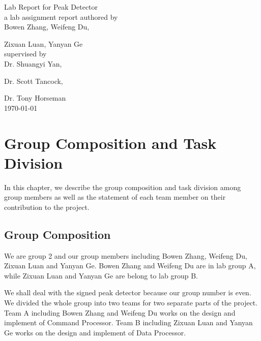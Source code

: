\documentclass[11pt,a4paper]{report}
\begin{document}
\begin{titlepage}
\centering
\vspace{8cm}
\huge Lab Report for Peak Detector \\
\vspace{2cm}
\large a lab assignment report authored by\\
\Large Bowen Zhang, Weifeng Du, \par Zixuan Luan, Yanyan Ge\\
\vspace{4cm}
\large supervised by\\
\large Dr. Shuangyi Yan,\par Dr. Scott Tancock,\par Dr. Tony Horseman\\
\vspace{2cm}
\daymonthyear\today \\
\end{titlepage}

%
\tableofcontents
\glsaddall

\chapter{Group Composition and Task Division}
\label{chap:Group Composition and Task Division}

In this chapter, we describe the group composition and task division
among group members as well as the statement of each team member on their contribution to the project.

\section{Group Composition} 
\label{sec:Group Composition}
We are group 2 and our group members including Bowen Zhang, Weifeng Du, Zixuan Luan and Yanyan Ge. Bowen Zhang and Weifeng Du are in lab group A, while Zixuan Luan and Yanyan Ge are belong to lab group B.

We shall deal with the signed peak detector because our group number is even. We divided the whole group into two teams for two separate parts of the project. Team A including Bowen Zhang and Weifeng Du works on the design and implement of Command Processor. Team B including Zixuan Luan and Yanyan Ge works on the design and implement of Data Processor.
\end{document}
